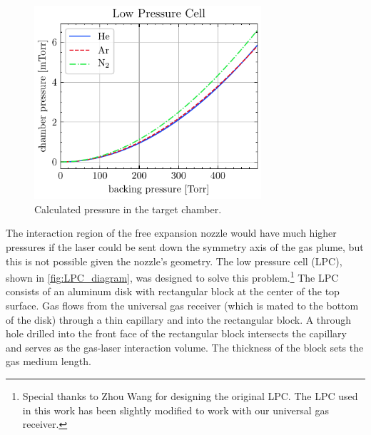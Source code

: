 \begin{figure}
	\centering
	\includegraphics[width=0.75\textwidth]{figures/chap3/LPC_chamber_p.pdf}
	\caption{Calculated pressure in the target chamber.}
	\label{fig:LPC_chamber_p}
\end{figure}

The interaction region of the free expansion nozzle would have much higher pressures if the laser could be sent down the symmetry axis of the gas plume, but this is not possible given the nozzle's geometry. The low pressure cell (LPC), shown in \cref{fig:LPC_diagram}, was designed to solve this problem.\footnote{Special thanks to Zhou Wang \cite{wangMidinfraredStrongfieldLaser2018} for designing the original LPC. The LPC used in this work has been slightly modified to work with our universal gas receiver.} The LPC consists of an aluminum disk with rectangular block at the center of the top surface. Gas flows from the universal gas receiver (which is mated to the bottom of the disk) through a thin capillary and into the rectangular block. A through hole drilled into the front face of the rectangular block intersects the capillary and serves as the gas-laser interaction volume. The thickness of the block sets the gas medium length.

